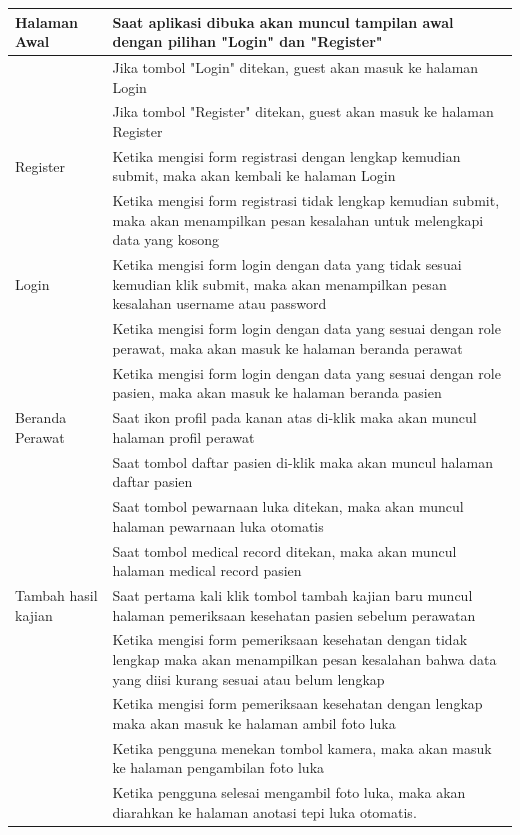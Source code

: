 \begin{enumerate}
\begin{longtable}[c]{@{} |p{4cm}|p{9.3cm}| @{}}
 	Halaman Awal & Saat aplikasi dibuka akan muncul tampilan awal dengan pilihan "Login" dan "Register"\\
	\hline
	& Jika tombol "Login" ditekan, guest akan masuk ke halaman Login\\
	\hline
	& Jika tombol "Register" ditekan, guest akan masuk ke halaman Register\\
	\hline
	Register & Ketika mengisi form registrasi dengan lengkap kemudian submit, maka akan kembali ke halaman Login\\
	\hline
	& Ketika mengisi form registrasi tidak lengkap kemudian submit, maka akan menampilkan pesan kesalahan untuk melengkapi data yang kosong\\
	\hline
	Login & Ketika mengisi form login dengan data yang tidak sesuai kemudian klik submit, maka akan menampilkan pesan kesalahan username atau password\\
	\hline
	& Ketika mengisi form login dengan data yang sesuai dengan role perawat, maka akan masuk ke halaman beranda perawat\\
	\hline
	& Ketika mengisi form login dengan data yang sesuai dengan role pasien, maka akan masuk ke halaman beranda pasien\\
	\hline
	Beranda Perawat & Saat ikon profil pada kanan atas di-klik maka akan muncul halaman profil perawat\\
	\hline
	& Saat tombol daftar pasien di-klik maka akan muncul halaman daftar pasien\\
	\hline
	& Saat tombol pewarnaan luka ditekan, maka akan muncul halaman pewarnaan luka otomatis\\
	\hline
	& Saat tombol medical record ditekan, maka akan muncul halaman medical record pasien\\
	\hline
	Tambah hasil kajian & Saat pertama kali klik tombol tambah kajian baru muncul halaman pemeriksaan kesehatan pasien sebelum perawatan\\
	\hline
	& Ketika mengisi form pemeriksaan kesehatan dengan tidak lengkap maka akan menampilkan pesan kesalahan bahwa data yang diisi kurang sesuai atau belum lengkap\\
	\hline
	& Ketika mengisi form pemeriksaan kesehatan dengan lengkap maka akan masuk ke halaman ambil foto luka\\
	\hline
	& Ketika pengguna menekan tombol kamera, maka akan masuk ke halaman pengambilan foto luka\\
	\hline
	& Ketika pengguna selesai mengambil foto luka, maka akan diarahkan ke halaman anotasi tepi luka otomatis.\\

\end{longtable}
\end{enumerate}
